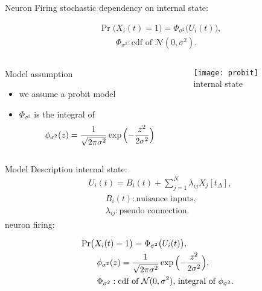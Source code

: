 \documentclass[fleqn,aspectratio=1610]{beamer}
\begin{document}
\begin{frame}[label={sec:org7b5ff49}]{Neuron Firing}
stochastic dependency on internal state:

\begin{align}
  &\Pr\bigl(X_i(t)=1\bigr)
    = \Phi_{\sigma^{2}}\bigl(U_i(t)\bigr),\\
  &\qquad
    \Phi_{\sigma^{2}}: \text{cdf of }\mathcal{N}(0,\sigma^{2}).
\end{align}
\begin{columns}
\begin{column}{0.6\columnwidth}
\begin{alertblock}{Model assumption}
\begin{itemize}
\item we assume a probit model
\item \(\Phi_{\sigma^{2}}\) is the integral of
\begin{equation}
  \phi_{\sigma^2}(z)
  =\frac{1}{\sqrt{2\pi\sigma^2}}\exp{\Bigl(-\frac{z^2}{2\sigma^2}\Bigr)}
\end{equation}
\end{itemize}
\end{alertblock}
\end{column}
\begin{column}{0.4\columnwidth}
\centering
\small
{}
\texttt{[image: probit]}\\[0pt]
internal state
\end{column}
\end{columns}
\end{frame}

\begin{frame}[label={sec:org64f0a7e}]{Model Description}
internal state:
\begin{align}
  &U_i(t)
    = B_i(t) + \sum_{j=1}^{N} \lambda_{ij} X_j[t_\Delta],\\
  &\qquad B_{i}(t): \text{nuisance inputs},\\
  &\qquad \lambda_{ij}: \text{pseudo connection}.
\end{align}
neuron firing:

\begin{align}
  &\Pr\bigl(X_i(t)=1\bigr)
    = \Phi_{\sigma^{2}}\bigl(U_i(t)\bigr),\\
  &\qquad
    \phi_{\sigma^2}(z)
    =\frac{1}{\sqrt{2\pi\sigma^2}}\exp{\Bigl(-\frac{z^2}{2\sigma^2}\Bigr)},\\
  &\qquad
    \Phi_{\sigma^{2}}:
    \text{cdf of \(\mathcal{N}(0,\sigma^{2})\),
    integral of \(\phi_{\sigma^2}\).}
\end{align}
\end{frame}
\end{document}
